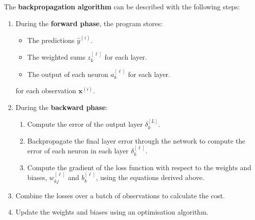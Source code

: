 \documentclass{article}
\begin{document}
The \textbf{backpropagation algorithm} can be
described with the following steps:
\begin{enumerate}
    \item During the \textbf{forward phase}, the program stores:
          \begin{itemize}
              \item The predictions \(\hat{y}^{\left( i \right)}\).
              \item The weighted sums \(z_k^{\left[ \ell \right]}\) for
                    each layer.
              \item The output of each neuron \(a_k^{\left[ \ell
                    \right]}\) for each layer.
          \end{itemize}
          for each observation \(\symbf{x}^{\left( i \right)}\).
    \item During the \textbf{backward phase}:
          \begin{enumerate}
              \item Compute the error of the output layer
                    \(\delta_k^{\left[ L \right]}\).
              \item Backpropagate the final layer error through the
                    network to compute the error of each neuron in each
                    layer \(\delta_k^{\left[ \ell \right]}\).
              \item Compute the gradient of the loss function with
                    respect to the weights and biases, \(w_{kj}^{\left[
                    \ell \right]}\) and \(b_k^{\left[ \ell \right]}\),
                    using the equations derived above.
          \end{enumerate}
    \item Combine the losses over a batch of observations to calculate
          the cost.
    \item Update the weights and biases using an optimisation
          algorithm.
\end{enumerate}
\end{document}
